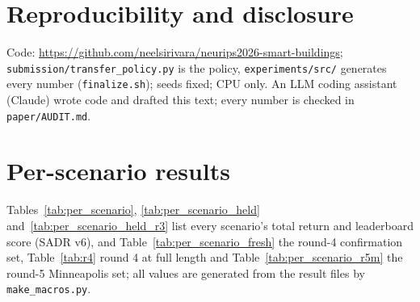\documentclass{article}
\begin{document}
\section{Reproducibility and disclosure}
Code: \url{https://github.com/neelsirivara/neurips2026-smart-buildings}; \texttt{submission/transfer\_policy.py} is
the policy, \texttt{experiments/src/} generates every number (\texttt{finalize.sh}); seeds fixed; CPU only. An LLM
coding assistant (Claude) wrote code and drafted this text; every number is checked in \texttt{paper/AUDIT.md}.




\clearpage
\appendix
\section{Per-scenario results}
\label{app:per_scenario}
Tables~\ref{tab:per_scenario}, \ref{tab:per_scenario_held} and~\ref{tab:per_scenario_held_r3}
list every scenario's total return and leaderboard score (SADR v6), and
Table~\ref{tab:per_scenario_fresh} the round-4 confirmation set, Table~\ref{tab:r4} round 4 at full length and
Table~\ref{tab:per_scenario_r5m} the round-5 Minneapolis set; all values are generated from the
result files by \texttt{make\_macros.py}.
\end{document}
